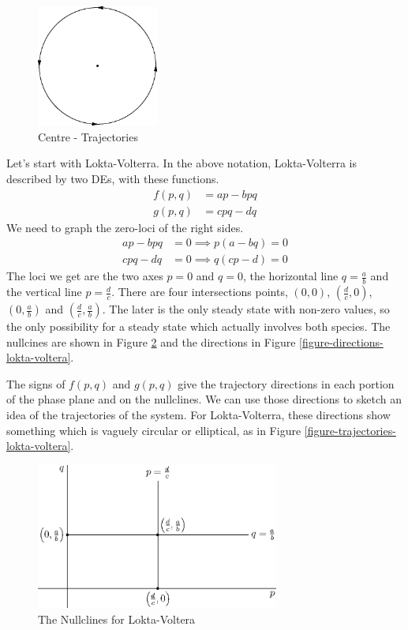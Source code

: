 \documentclass[fleqn,letterpaper]{report}
\begin{document}
\begin{figure}[t]
\centering
\includegraphics[width=4cm]{figure50.eps}
\caption{Centre - Trajectories}
\label{figure-centre-trajectories}
\end{figure}

\begin{example}
Let's start with Lokta-Volterra. In the above
notation, Lokta-Volterra is described by two DEs, with these
functions.
\begin{align*}
f(p,q) & = ap - bpq \\
g(p,q) & = cpq - dq 
\end{align*}
We need to graph the zero-loci of the right sides.
\begin{align*}
ap - bpq & = 0 \implies p ( a - bq) = 0\\
cpq - dq & = 0 \implies q (cp - d) = 0
\end{align*}
The loci we get are the two axes $p=0$ and $q=0$, the
horizontal line $q = \frac{a}{b}$ and the vertical line $p =
\frac{d}{c}$. There are four intersections points, $(0,0)$,
$\left(\frac{d}{c},0\right)$, $\left(0,\frac{a}{b} \right)$
and $\left( \frac{d}{c}, \frac{a}{b} \right)$. The later is
the only steady state with non-zero values, so the only
possibility for a steady state which actually involves both
species. The nullcines are shown in Figure
\ref{figure-nullclines-lokta-voltera} and the directions in Figure
\ref{figure-directions-lokta-voltera}. 

The signs of $f(p,q)$ and $g(p,q)$ give the trajectory
directions in each portion of the phase plane and on the
nullclines. We can use those directions to sketch an idea of
the trajectories of the system. For Lokta-Volterra, these
directions show something which is vaguely circular or
elliptical, as in Figure \ref{figure-trajectories-lokta-voltera}.
\end{example}

\begin{figure}[t]
\centering
\includegraphics[width=8cm]{figure24.eps}
\caption{The Nullclines for Lokta-Voltera}
\label{figure-nullclines-lokta-voltera}
\end{figure}
\end{document}

